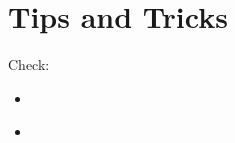 \chapter{Tips and Tricks}

Check:
\begin{itemize}
	\item \cite{pineau2018reproducible}
	\item \cite{schulman2017nuts}
\end{itemize}